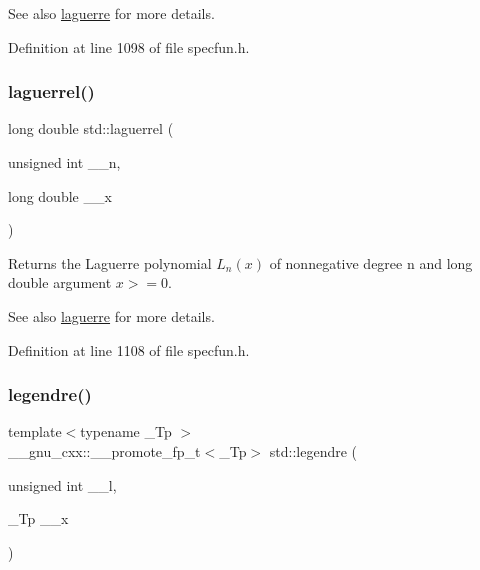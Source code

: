 \begin{DoxySeeAlso}{See also}
\hyperlink{group__tr29124__math__spec__func_gaf1927ca6432351e3a7af47e158e63862}{laguerre} for more details. 
\end{DoxySeeAlso}


Definition at line 1098 of file specfun.\+h.

\mbox{\label{group__tr29124__math__spec__func_gaaf8b141edf9163b37ea4f2ed3e0191fc}} 
\subsubsection{\texorpdfstring{laguerrel()}{laguerrel()}}
{\footnotesize\ttfamily long double std\+::laguerrel (\begin{DoxyParamCaption}\item[{unsigned int}]{\+\_\+\+\_\+n,  }\item[{long double}]{\+\_\+\+\_\+x }\end{DoxyParamCaption})\hspace{0.3cm}{\ttfamily [inline]}}

Returns the Laguerre polynomial $ L_n(x) $ of nonnegative degree {\ttfamily n} and {\ttfamily long double} argument $ x >= 0 $.

\begin{DoxySeeAlso}{See also}
\hyperlink{group__tr29124__math__spec__func_gaf1927ca6432351e3a7af47e158e63862}{laguerre} for more details. 
\end{DoxySeeAlso}


Definition at line 1108 of file specfun.\+h.

\mbox{\label{group__tr29124__math__spec__func_ga327bb7686d2e63d85e8c6b1b42b3b29e}} 
\subsubsection{\texorpdfstring{legendre()}{legendre()}}
{\footnotesize\ttfamily template$<$typename \+\_\+\+Tp $>$ \\
\+\_\+\+\_\+gnu\+\_\+cxx\+::\+\_\+\+\_\+promote\+\_\+fp\+\_\+t$<$\+\_\+\+Tp$>$ std\+::legendre (\begin{DoxyParamCaption}\item[{unsigned int}]{\+\_\+\+\_\+l,  }\item[{\+\_\+\+Tp}]{\+\_\+\+\_\+x }\end{DoxyParamCaption})\hspace{0.3cm}{\ttfamily [inline]}}

